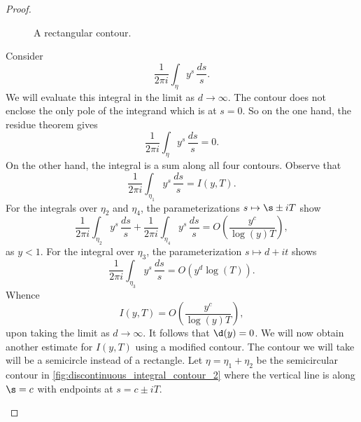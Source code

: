 \documentclass[12pt]{article}
\begin{document}
\begin{proof}
\begin{figure}[h]
          \caption{A rectangular contour.}
          \label{fig:discontinuous_integral_contour_1}
        \end{figure}

        \noindent Consider
        \[
          \frac{1}{2\pi i}\int_{\eta}y^{s}\,\frac{ds}{s}.
        \]
        We will evaluate this integral in the limit as \(d \to \infty\). The contour does not enclose the only pole of the integrand which is at \(s = 0\). So on the one hand, the residue theorem gives 
        \[
          \frac{1}{2\pi i}\int_{\eta}y^{s}\,\frac{ds}{s} = 0.
        \]
        On the other hand, the integral is a sum along all four contours. Observe that
        \[
          \frac{1}{2\pi i}\int_{\eta_{1}}y^{s}\,\frac{ds}{s} = I(y,T).
        \]
        For the integrals over \(\eta_{2}\) and \(\eta_{4}\), the parameterizations \(s \mapsto \s\pm iT\) show
        \[
          \frac{1}{2\pi i}\int_{\eta_{2}}y^{s}\,\frac{ds}{s}+\frac{1}{2\pi i}\int_{\eta_{4}}y^{s}\,\frac{ds}{s} = O\left(\frac{y^{c}}{\log(y)T}\right),
        \]
        as \(y < 1\). For the integral over \(\eta_{3}\), the parameterization \(s \mapsto d+it\) shows
        \[
          \frac{1}{2\pi i}\int_{\eta_{3}}y^{s}\,\frac{ds}{s} = O\left(y^{d}\log(T)\right).
        \]
        Whence
        \[
          I(y,T) = O\left(\frac{y^{c}}{\log(y)T}\right),
        \]
        upon taking the limit as \(d \to \infty\). It follows that \(\d(y) = 0\). We will now obtain another estimate for \(I(y,T)\) using a modified contour. The contour we will take will be a semicircle instead of a rectangle. Let \(\eta = \eta_{1}+\eta_{2}\) be the semicircular contour in \cref{fig:discontinuous_integral_contour_2} where the vertical line is along \(\s = c\) with endpoints at \(s = c\pm iT\).

        \begin{figure}[h]
          \centering
\end{figure}
\end{proof}
\end{document}
